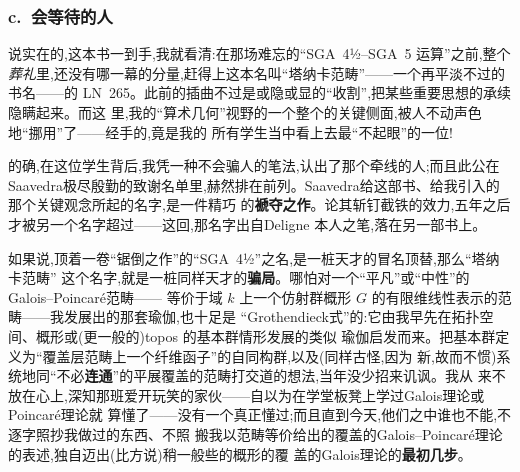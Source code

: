 \subsubsection{c.\ 会等待的人}


\dmark{}说实在的,这本书一到手,我就看清:在那场难忘的“SGA~4½--SGA~5 运算”之前,整个
\emph{葬礼}里,还没有哪一幕的分量,赶得上这本名叫“塔纳卡范畴”——一个再平淡不过的书名——的
LN~265。此前的插曲不过是或隐或显的“收割”,把某些重要思想的承续隐瞒起来。而这
里,我的“算术几何”视野的一个整个的关键侧面,被人不动声色地“挪用”了——经手的,竟是我的
所有学生当中看上去最“不起眼”的一位!

\pmark 的确,在这位学生背后,我凭一种不会骗人的笔法,认出了那个牵线的人;而且此公在Saavedra极尽殷勤的致谢名单里,赫然排在前列。Saavedra给这部书、给我引入的那个关键观念所起的名字,是一件精巧
的\textbf{褫夺之作}。论其斩钉截铁的效力,五年之后才被另一个名字超过——这回,那名字出自Deligne
本人之笔,落在另一部书上。

\pmark 如果说,顶着一卷“锯倒之作”的“SGA~4½”之名,是一桩天才的冒名顶替,那么“塔纳卡范畴”
这个名字,就是一桩同样天才的\textbf{骗局}。哪怕对一个“平凡”或“中性”的Galois--Poincaré范畴——
等价于域 $k$ 上一个仿射群概形 $G$ 的有限维线性表示的范畴——我发展出的那套瑜伽,也十足是
“Grothendieck式”的:它由我早先在拓扑空间、概形或(更一般的)topos 的基本群情形发展的类似
瑜伽启发而来。把基本群定义为“覆盖层范畴上一个纤维函子”的自同构群,以及(同样古怪,因为
新,故而不惯)系统地同“不必\dmark{}\textbf{连通}”的平展覆盖的范畴打交道的想法,当年没少招来讥讽。我从
来不放在心上,深知那班爱开玩笑的家伙——自以为在学堂板凳上学过Galois理论或Poincaré理论就
算懂了——没有一个真正懂过;而且直到今天,他们之中谁也不能,不逐字照抄我做过的东西、不照
搬我以范畴等价给出的覆盖的Galois--Poincaré理论的表述,独自迈出(比方说)稍一般些的概形的覆
盖的Galois理论的\textbf{最初几步}。


